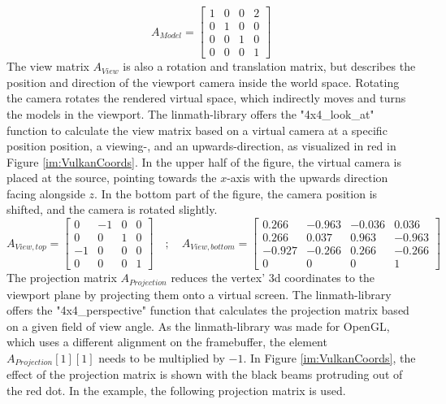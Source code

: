 \begin{equation*}
    A_{Model} =
\begin{bmatrix}
    1 & 0 & 0 & 2 \\
    0 & 1 & 0 & 0 \\
    0 & 0 & 1 & 0 \\
    0 & 0 & 0 & 1
\end{bmatrix}
\end{equation*}
The view matrix $A_{View}$ is also a rotation and translation matrix, but describes the position and direction of the viewport camera inside the world space. Rotating the camera rotates the rendered virtual space, which indirectly moves and turns the models in the viewport. The linmath-library\cite{linmath_lib} offers the "4x4\_look\_at" function to calculate the view matrix based on a virtual camera at a specific position position, a viewing-, and an upwards-direction, as visualized in red in Figure \ref{im:VulkanCoords}. In the upper half of the figure, the virtual camera is placed at the source, pointing towards the $x$-axis with the upwards direction facing alongside $z$. In the bottom part of the figure, the camera position is shifted, and the camera is rotated slightly.
\begin{equation*}
    A_{View, top} = 
\begin{bmatrix}
    0 & -1& 0 & 0 \\
    0 & 0 & 1 & 0 \\
    -1 & 0 & 0 & 0 \\
    0 & 0 & 0 & 1
\end{bmatrix} \quad ; \quad
    A_{View, bottom} =
\begin{bmatrix}
    0.266 &-0.963 & -0.036 & 0.036 \\
    0.266 & 0.037 & 0.963 & -0.963 \\
    -0.927 &-0.266 & 0.266 & -0.266 \\
    0 & 0 & 0 & 1
\end{bmatrix}
\end{equation*}
The projection matrix $A_{Projection}$ reduces the vertex' 3d coordinates to the viewport plane by projecting them onto a virtual screen. The linmath-library offers the "4x4\_perspective" function that calculates the projection matrix based on a given field of view angle. As the linmath-library was made for OpenGL, which uses a different alignment on the framebuffer, the element $A_{Projection}[1][1]$ needs to be multiplied by $-1$. In Figure \ref{im:VulkanCoords}, the effect of the projection matrix is shown with the black beams protruding out of the red dot. In the example, the following projection matrix is used.
